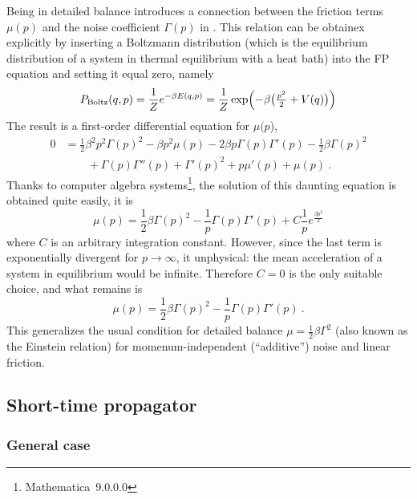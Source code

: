 Being in detailed balance introduces a connection between the friction terms \(\mu(p)\) and the noise coefficient \(\Gamma(p)\) in . This relation can be obtainex explicitly by inserting a Boltzmann distribution (which is the equilibrium distribution of a system in thermal equilibrium with a heat bath) into the FP equation  and setting it equal zero, namely
%
\begin{equation}
	P_\text{Boltz}(q,p)
	= \frac1Ze^{-\beta E(q,p)}
	= \frac1Z\exp\Bigl(-\beta \bigl(\tfrac{p^2}2+V(q)\bigr)\Bigr)
\end{equation}
%
The result is a first-order differential equation for \(\mu(p\)),
%
\begin{equation}\begin{split}
	0
	&=
	\frac12 \beta^2 p^2 \Gamma(p)^2
	- \beta p^2 \mu(p)
	- 2 \beta p \Gamma(p) \Gamma'(p)
	- \frac12 \beta  \Gamma(p)^2
	\\&\qquad
	+\Gamma(p) \Gamma''(p)
	+ \Gamma'(p)^2
	+ p \mu'(p)
	+ \mu(p)  ~.
\end{split}\end{equation}
%
Thanks to computer algebra systems\footnote{Mathematica~9.0.0.0}, the solution of this daunting equation is obtained quite easily, it is
%
\begin{equation}
	\mu(p) = \frac12\beta\Gamma(p)^2 - \frac1p\Gamma(p)\Gamma'(p) + C\frac1pe^{\frac{\beta p^2}2}
\end{equation}
%
where \(C\) is an arbitrary integration constant. However, since the last term is exponentially divergent for \(p\to\infty\), it unphysical: the mean acceleration of a system in equilibrium would be infinite. Therefore \(C = 0\) is the only suitable choice, and what remains is
%
\begin{equation}
	\label{eqn:einstein}
	\mu(p) = \frac12\beta\Gamma(p)^2 - \frac1p\Gamma(p)\Gamma'(p) ~.
\end{equation}
%
This generalizes the usual condition for detailed balance \(\mu = \frac12\beta\Gamma^2\)  (also known as the Einstein relation) for momenum-independent (``additive'') noise and linear friction.



\subsection{Short-time propagator}

\subsubsection{General case}
\label{sec:general propagator case}


